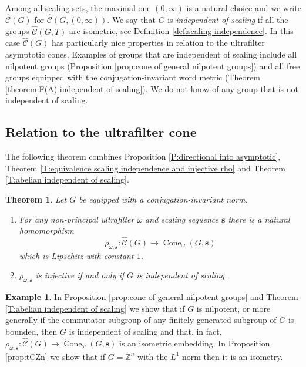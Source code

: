 \documentclass[12pt]{amsart}
\newtheorem{theorem}[prop]{Theorem}
\theoremstyle{definition}
\newtheorem{example}[prop]{Example}
\def\ZZ{\ensuremath{\mathbb{Z}}}
\newcommand{\B}[1]{\mathbf{#1}}
\newcommand{\OP}[1]{\operatorname{#1}}
\def\Cone{\OP{Cone}}
\def\tC{\hat{\mathcal{C}}}
\begin{document}
Among all scaling sets, the maximal one $(0,\infty)$ is a natural choice and we write $\tC(G)$ for $\tC(G,(0,\infty))$.
We say that $G$ is {\em independent of scaling} if all the groups $\tC(G,T)$ are isometric,  see Definition \ref{def:scaling independence}.
In this case $\tC(G)$ has particularly nice properties in relation to the ultrafilter asymptotic cones. 
Examples of groups that are independent of scaling include all nilpotent groups (Proposition \ref{prop:cone of general nilpotent groups}) and all free groups equipped with the conjugation-invariant word metric (Theorem \ref{theorem:F(A) independent of scaling}).
We do not know of any group that is not independent of scaling.






\subsection*{Relation to the ultrafilter cone}
The following theorem combines Proposition \ref{P:directional into asymptotic}, Theorem \ref{T:equivalence scaling independence and injective rho} and Theorem \ref{T:abelian independent of scaling}.


\begin{theorem}
Let $G$ be  equipped with a conjugation-invariant norm.
\begin{enumerate}[label=(\alph*)]
\item
For any non-principal ultrafilter $\omega$ and scaling sequence $\B s$ there is a natural homomorphism 
\[
\rho_{\omega,\B s} \colon \tC(G) \to \Cone_\omega(G,\B s)
\]
which is Lipschitz with constant $1$. %

\item
 $\rho_{\omega,\B s}$ is injective if and only if $G$ is independent of scaling.
\end{enumerate}
\end{theorem}



\begin{example}
In Proposition \ref{prop:cone of general nilpotent groups} and Theorem \ref{T:abelian independent of scaling} we show that if $G$ is nilpotent, or more generally if the commutator subgroup of any finitely generated subgroup of $G$ is bounded, then $G$ is independent of scaling and that, in fact, $\rho_{\omega,\B s} \colon \tC(G) \to \Cone_\omega(G,\B s)$ is an isometric embedding.
In Proposition \ref{prop:tCZn} we show that if $G=\ZZ^n$ with the $L^1$-norm then it is an isometry.
\end{example}
\end{document}
